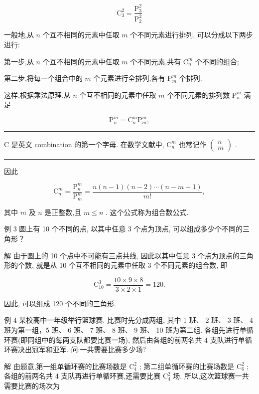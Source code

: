 \documentclass[10pt]{article}
\newcommand{\HRule}{\begin{center}\rule{0.9\linewidth}{0.2mm}\end{center}}
\begin{document}
\[
{\mathrm{C}}_{3}^{2} = \frac{{\mathrm{P}}_{3}^{2}}{{\mathrm{P}}_{2}^{2}}
\]

一般地,从 \(n\) 个互不相同的元素中任取 \(m\) 个不同元素进行排列, 可以分成以下两步进行:

第一步,从 \(n\) 个互不相同的元素中任取 \(m\) 个不同元素,共有 \({\mathrm{C}}_{n}^{m}\) 个不同的组合;

第二步,将每一个组合中的 \(m\) 个元素进行全排列,各有 \({\mathrm{P}}_{m}^{m}\) 个排列.

这样,根据乘法原理,从 \(n\) 个互不相同的元素中任取 \(m\) 个不同元素的排列数 \({\mathrm{P}}_{n}^{m}\) 满足

\[
{\mathrm{P}}_{n}^{m} = {\mathrm{C}}_{n}^{m}{\mathrm{P}}_{m}^{m},
\]

\HRule

C 是英文 combination 的第一个字母. 在数学文献中, \({\mathrm{C}}_{n}^{m}\) 也常记作 \(\left( \begin{array}{l} n \\  m \end{array}\right)\) .

\HRule

因此

\[
{\mathrm{C}}_{n}^{m} = \frac{{\mathrm{P}}_{n}^{m}}{{\mathrm{P}}_{m}^{m}} = \frac{n\left( {n - 1}\right) \left( {n - 2}\right) \cdots \left( {n - m + 1}\right) }{m!},
\]

其中 \(m\) 及 \(n\) 是正整数,且 \(m \leq  n\) . 这个公式称为组合数公式.

例 3 圆上有 10 个不同的点, 以其中任意 3 个点为顶点, 可以组成多少个不同的三角形？

解 由于圆上的 10 个点中不可能有三点共线, 因此以其中任意 3 个点为顶点的三角形的个数, 就是从 10 个互不相同的元素中任取 3 个不同元素的组合数, 即

\[
{\mathrm{C}}_{10}^{3} = \frac{{10} \times  9 \times  8}{3 \times  2 \times  1} = {120}.
\]

因此, 可以组成 120 个不同的三角形.

例 4 某校高中一年级举行篮球赛. 比赛时先分成两组, 其中 1 班、 2 班、 3 班、 4 班为第一组，5 班、 6 班、 7 班、 8 班、 9 班、 10 班为第二组. 各组先进行单循环赛(即同组中的每两支队都要比赛一场), 然后由各组的前两名共 4 支队进行单循环赛决出冠军和亚军. 问:一共需要比赛多少场?

解 由题意,第一组单循环赛的比赛场数是 \({\mathrm{C}}_{4}^{2}\) ; 第二组单循环赛的比赛场数是 \({\mathrm{C}}_{6}^{2}\) ; 各组的前两名共 4 支队再进行单循环赛,还需要比赛 \({\mathrm{C}}_{4}^{2}\) 场. 所以,这次篮球赛一共需要比赛的场次为
\end{document}

